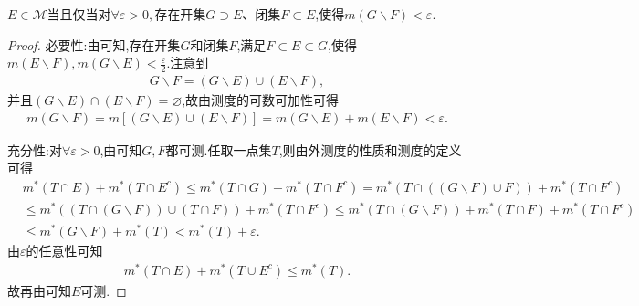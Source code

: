 \documentclass[../../main.tex]{subfiles}%
\begin{document}
\begin{corollary}\label{corollary:集合可测的充要条件2}
$E\in \mathscr{M}$当且仅当对$\forall \varepsilon>0,$存在开集$G\supset E$、闭集$F\subset E$,使得$m(G\backslash F)<\varepsilon.$
\end{corollary}
\begin{proof}

{\heiti 必要性:}由可知,存在开集$G$和闭集$F$,满足$F\subset E\subset G$,使得$m(E\backslash F),m(G\backslash E)<\frac{\varepsilon}{2}$.注意到
\begin{align*}
G\backslash F=(G\backslash E)\cup (E\backslash F),
\end{align*}
并且$(G\backslash E)\cap (E\backslash F)=\varnothing$,故由测度的可数可加性可得
\begin{align*}
m(G\backslash F)=m[(G\backslash E)\cup (E\backslash F)]=m(G\backslash E)+m(E\backslash F)<\varepsilon.
\end{align*}

{\heiti 充分性:}对$\forall \varepsilon>0$,由可知$G,F$都可测.任取一点集$T$,则由外测度的性质和测度的定义可得
\begin{align*}
&m^*\left( T\cap E \right) +m^*\left( T\cap E^c \right) \leqslant m^*\left( T\cap G \right) +m^*\left( T\cap F^c \right) =m^*(T\cap \left( \left( G\backslash F \right) \cup F \right) )+m^*\left( T\cap F^c \right) 
\\
&\leqslant m^*\left( \left( T\cap \left( G\backslash F \right) \right) \cup \left( T\cap F \right) \right) +m^*\left( T\cap F^c \right) \leqslant m^*\left( T\cap \left( G\backslash F \right) \right) +m^*\left( T\cap F \right) +m^*\left( T\cap F^c \right) 
\\
&\leqslant m^*\left( G\backslash F \right) +m^*\left( T \right) <m^*\left( T \right) +\varepsilon .
\end{align*}
由$\varepsilon$的任意性可知
\begin{align*}
m^*\left( T\cap E \right) +m^*\left( T\cup E^c \right) \leqslant m^*(T).
\end{align*}
故再由可知$E$可测.
\end{proof}
\end{document}
